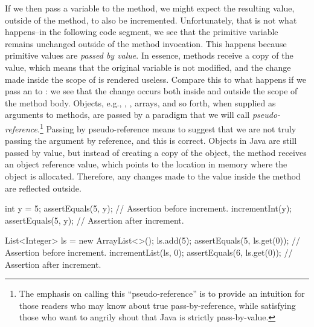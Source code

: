 If we then pass a variable to the  method, we might expect the resulting value, outside of the method, to also be incremented. Unfortunately, that is not what happens--in the following code segment, we see that the primitive variable  remains unchanged outside of the method invocation. This happens because primitive values are \textit{passed by value}. In essence, methods receive a copy of the value, which means that the original variable is not modified, and the change made inside the scope of  is rendered useless. Compare this to what happens if we pass an  to : we see that the change occurs both inside and outside the scope of the method body. Objects, e.g., , , arrays, and so forth, when supplied as arguments to methods, are passed by a paradigm that we will call \textit{pseudo-reference}.\footnote{The emphasis on calling this ``pseudo-reference'' is to provide an intuition for those readers who may know about true pass-by-reference, while satisfying those who want to angrily shout that Java is strictly pass-by-value.} Passing by pseudo-reference means to suggest that we are not truly passing the argument by reference, and this is correct. Objects in Java are still passed by value, but instead of creating a copy of the object, the method receives an object reference value, which points to the location in memory where the object is allocated. Therefore, any changes made to the value inside the method are reflected outside.

\begin{verbnobox}[\small]
int y = 5;
assertEquals(5, y);         // Assertion before increment.
incrementInt(y);
assertEquals(5, y);         // Assertion after increment.
\end{verbnobox}

\begin{verbnobox}[\small]
List<Integer> ls = new ArrayList<>();
ls.add(5);
assertEquals(5, ls.get(0)); // Assertion before increment.
incrementList(ls, 0);
assertEquals(6, ls.get(0)); // Assertion after increment.
\end{verbnobox}


